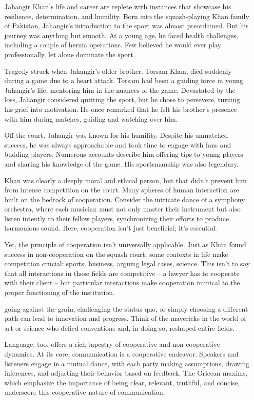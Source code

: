 Jahangir Khan's life and career are replete with instances that showcase his resilience, determination, and humility. Born into the squash-playing Khan family of Pakistan, Jahangir's introduction to the sport was almost preordained. But his journey was anything but smooth. At a young age, he faced health challenges, including a couple of hernia operations. Few believed he would ever play professionally, let alone dominate the sport.

Tragedy struck when Jahangir's older brother, Torsam Khan, died suddenly during a game due to a heart attack. Torsam had been a guiding force in young Jahangir's life, mentoring him in the nuances of the game. Devastated by the loss, Jahangir considered quitting the sport, but he chose to persevere, turning his grief into motivation. He once remarked that he felt his brother's presence with him during matches, guiding and watching over him.

Off the court, Jahangir was known for his humility. Despite his unmatched success, he was always approachable and took time to engage with fans and budding players. Numerous accounts describe him offering tips to young players and sharing his knowledge of the game. His sportsmanship was also legendary.

Khan was clearly a deeply moral and ethical person, but that didn't prevent him from intense competition on the court. Many spheres of human interaction are built on the bedrock of cooperation. Consider the intricate dance of a symphony orchestra, where each musician must not only master their instrument but also listen intently to their fellow players, synchronizing their efforts to produce harmonious sound. Here, cooperation isn't just beneficial; it's essential.

Yet, the principle of cooperation isn't universally applicable. Just as Khan found success in non-cooperation on the squash court, some contexts in life make competition crucial: sports, business, arguing legal cases, science. This isn't to say that all interactions in those fields are competitive -- a lawyer has to cooperate with their client -- but particular interactions make cooperation inimical to the proper functioning of the institution.

going against the grain, challenging the status quo, or simply choosing a different path can lead to innovation and progress. Think of the mavericks in the world of art or science who defied conventions and, in doing so, reshaped entire fields.

Language, too, offers a rich tapestry of cooperative and non-cooperative dynamics. At its core, communication is a cooperative endeavor. Speakers and listeners engage in a mutual dance, with each party making assumptions, drawing inferences, and adjusting their behavior based on feedback. The Gricean maxims, which emphasize the importance of being clear, relevant, truthful, and concise, underscore this cooperative nature of communication.

